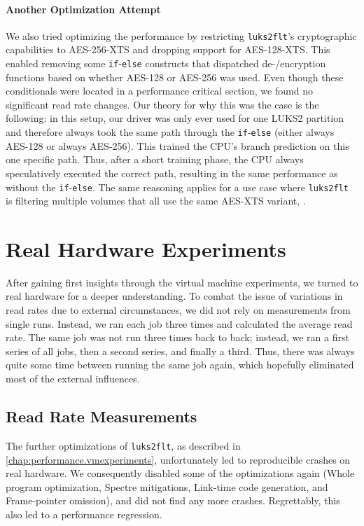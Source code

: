 \paragraph{Another Optimization Attempt}
We also tried optimizing the performance by restricting \texttt{luks2flt}'s cryptographic capabilities to AES-256-XTS and dropping support for AES-128-XTS. This enabled removing some \texttt{if}-\texttt{else} constructs that dispatched de-/encryption functions based on whether AES-128 or AES-256 was used. Even though these conditionals were located in a performance critical section, we found no significant read rate changes. Our theory for why this was the case is the following: in this setup, our driver was only ever used for one LUKS2 partition and therefore always took the same path through the \texttt{if}-\texttt{else} (either always AES-128 or always AES-256). This trained the CPU's branch prediction on this one specific path. Thus, after a short training phase, the CPU always speculatively executed the correct path, resulting in the same performance as without the \texttt{if}-\texttt{else}. The same reasoning applies for a use case where \texttt{luks2flt} is filtering multiple volumes that all use the same AES-XTS variant, .

\section{Real Hardware Experiments}
\label{chap:performance.hwexperiments}
After gaining first insights through the virtual machine experiments, we turned to real hardware for a deeper understanding. To combat the issue of variations in read rates due to external circumstances, we did not rely on measurements from single runs. Instead, we ran each job three times and calculated the average read rate. The same job was not run three times back to back; instead, we ran a first series of all jobs, then a second series, and finally a third. Thus, there was always quite some time between running the same job again, which hopefully eliminated most of the external influences.

\subsection{Read Rate Measurements}
\label{chap:performance.hwexperiments.encryptedseries2}
The further optimizations of \texttt{luks2flt}, as described in \autoref{chap:performance.vmexperiments}, unfortunately led to reproducible crashes on real hardware.  We consequently disabled some of the optimizations again (Whole program optimization, Spectre mitigations, Link-time code generation, and Frame-pointer omission), and did not find any more crashes. Regrettably, this also led to a performance regression. 

